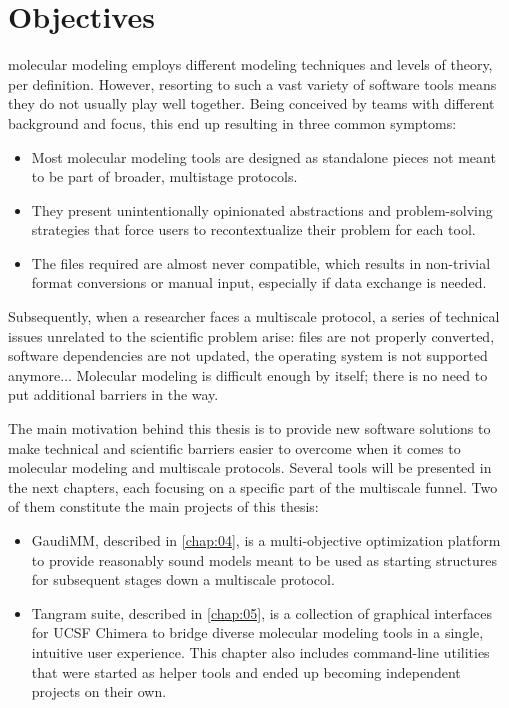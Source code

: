 \chapter{Objectives}
\label{chap:03}

 molecular modeling employs different modeling techniques and levels of theory, per definition. However, resorting to such a vast variety of software tools means they do not usually play well together. Being conceived by teams with different background and focus, this end up resulting in three common symptoms:

\begin{itemize}
	\item Most molecular modeling tools are designed as standalone pieces not meant to be part of broader, multistage protocols.

	\item They present unintentionally opinionated abstractions and problem-solving strategies that force users to recontextualize their problem for each tool.

	\item The files required are almost never compatible, which results in non-trivial format conversions or manual input, especially if data exchange is needed.
\end{itemize}

Subsequently, when a researcher faces a multiscale protocol, a series of technical issues unrelated to the scientific problem arise: files are not properly converted, software dependencies are not updated, the operating system is not supported anymore$ \ldots $  Molecular modeling is difficult enough by itself; there is no need to put additional barriers in the way.

The main motivation behind this thesis is to provide new software solutions to make technical and scientific barriers easier to overcome when it comes to molecular modeling and multiscale protocols. Several tools will be presented in the next chapters, each focusing on a specific part of the multiscale funnel. Two of them constitute the main projects of this thesis:

\begin{itemize}
	\item GaudiMM, described in \autoref{chap:04}, is a multi-objective optimization platform to provide reasonably sound models meant to be used as starting structures for subsequent stages down a multiscale protocol.

	\item Tangram suite, described in \autoref{chap:05}, is a collection of graphical interfaces for UCSF Chimera to bridge diverse molecular modeling tools in a single, intuitive user experience. This chapter also includes command-line utilities that were started as helper tools and ended up becoming independent projects on their own.
\end{itemize}

